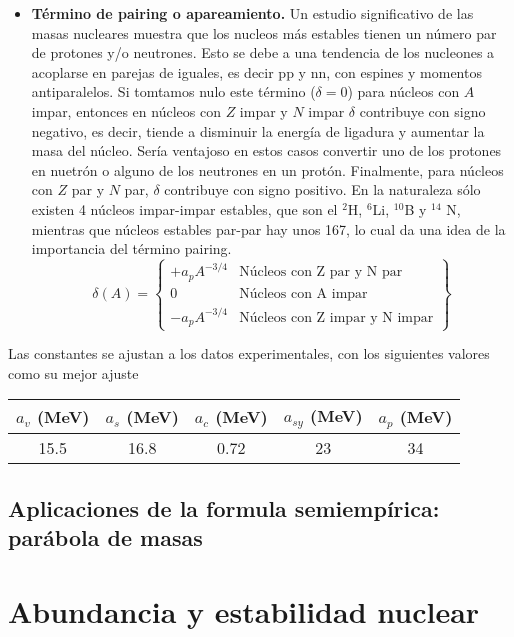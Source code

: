 \begin{itemize}
	\item \textbf{Término de pairing o apareamiento.} Un estudio significativo de las masas nucleares muestra que los nucleos más estables tienen un número par de protones y/o neutrones. Esto se debe a una tendencia de los nucleones a acoplarse en parejas de iguales, es decir pp y nn, con espines y momentos antiparalelos. Si tomtamos nulo este término ($\delta=0$) para núcleos con $A$ impar, entonces en núcleos con $Z$ impar y $N$ impar $\delta$ contribuye con signo negativo, es decir, tiende a disminuir la energía de ligadura y aumentar la masa del núcleo. Sería ventajoso en estos casos convertir uno de los protones en nuetrón o alguno de los neutrones en un protón. Finalmente, para núcleos con $Z$ par y $N$ par, $\delta$ contribuye con signo positivo. En la naturaleza sólo existen 4 núcleos impar-impar estables, que son el $^2$H, $^6$Li, $^{10}$B y $^{14}$ N, mientras que núcleos estables par-par hay unos 167, lo cual da una idea de la importancia del término pairing.
	      \begin{equation}
		      \delta (A) = \left\lbrace \begin{array}{rl}
			      +a_p A^{-3/4} & \text{Núcleos con Z par y N par}     \\
			      0             & \text{Núcleos con A impar}           \\
			      -a_p A^{-3/4} & \text{Núcleos con Z impar y N impar}
		      \end{array} \right \rbrace
	      \end{equation}
\end{itemize}
Las constantes se ajustan a los datos experimentales, con los siguientes valores como su mejor ajuste

\begin{table}[h!] \centering
	\begin{tabular}{ccccc}
		$a_v$ (MeV) & $a_s$ (MeV) & $a_c$ (MeV) & $a_{sy}$ (MeV) & $a_p$  (MeV) \\ \hline
		15.5        & 16.8        & 0.72        & 23             & 34
	\end{tabular}
\end{table}

\subsection{Aplicaciones de la formula semiempírica: parábola de masas}

\section{Abundancia y estabilidad nuclear}

